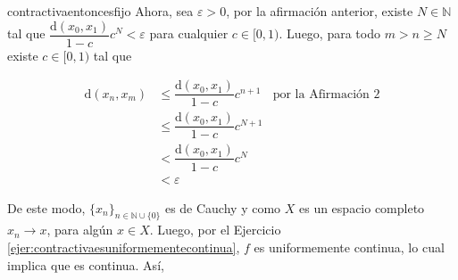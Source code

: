 \documentclass[12pt]{article}
\newenvironment{ejercicio}[1]{\begin{ejer}[breakable, pad at break = 5mm, leftrule = 0.7mm, rightrule = 0.7mm, right = 2mm, left = 2mm, enlarge bottom finally by = 3mm, fontlower = \setlength{\parskip}{2mm}]{}{#1}}{\end{ejer}}
\newcommand{\nat}{\mathbb{N}}
\begin{document}
\begin{ejercicio}{contractivaentoncesfijo}
		Ahora, sea $ \varepsilon > 0 $, por la afirmación anterior, existe $ N \in \nat $ tal que $ \dfrac{\mathrm{d} (x_0, x_1)}{1-c} c^N < \varepsilon $ para cualquier $ c \in [0,1) $. Luego, para todo $ m > n \geq N $ existe $ c \in [0,1) $ tal que

		\begin{align*}
			\mathrm{d} (x_n, x_m) &\leq \dfrac{\mathrm{d} (x_0, x_1)}{1-c} c^{n+1} & \mbox{por la Afirmación 2} \\
			&\leq \dfrac{\mathrm{d} (x_0, x_1)}{1-c} c^{N+1} & \\
			&< \dfrac{\mathrm{d} (x_0, x_1)}{1-c} c^N & \\
			&< \varepsilon
		\end{align*}

		De este modo, $ \lbrace x_n \rbrace_{n \in \nat \cup \{0\}} $ es de Cauchy y como $ X $ es un espacio completo $ x_n \to x $, para algún $ x \in X $. Luego, por el Ejercicio \ref{ejer:contractivaesuniformementecontinua}, $ f $ es uniformemente continua, lo cual implica que es continua. Así, 
	\end{ejercicio}
	
\end{document}
